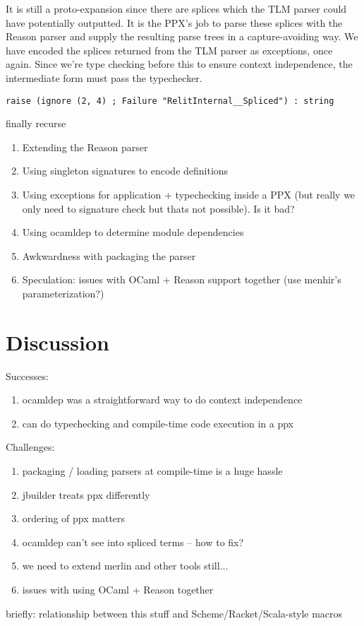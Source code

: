 \documentclass[acmsmall,review]{acmart}
\theoremstyle{slplain}
\numberwithin{thm}{section}
\begin{document}
It is still a proto-expansion since there are splices which the TLM parser could have potentially outputted. It is the PPX's job to parse these splices with the Reason parser and supply the resulting parse trees in a capture-avoiding way.  We have encoded the splices returned from the TLM parser as exceptions, once again. Since we're type checking 
before this to ensure context independence, the intermediate form must pass the typechecker.

\begin{lstlisting}
raise (ignore (2, 4) ; Failure "RelitInternal__Spliced") : string
\end{lstlisting}

finally recurse

\begin{enumerate}
  \item Extending the Reason parser
  \item Using singleton signatures to encode definitions
  \item Using exceptions for application + typechecking inside a PPX (but really we only need to signature check but thats not possible). Is it bad?
  \item Using ocamldep to determine module dependencies
  \item Awkwardness with packaging the parser
  \item Speculation: issues with OCaml + Reason support together (use menhir's parameterization?)
\end{enumerate}
\section{Discussion}
Successes:
\begin{enumerate}
  \item ocamldep was a straightforward way to do context independence
  \item can do typechecking and compile-time code execution in a ppx
\end{enumerate}

Challenges:
\begin{enumerate}
  \item packaging / loading parsers at compile-time is a huge hassle
  \item jbuilder treats ppx differently
  \item ordering of ppx matters
  \item ocamldep can't see into spliced terms -- how to fix?
  \item we need to extend merlin and other tools still...
  \item issues with using OCaml + Reason together
\end{enumerate}

briefly: relationship between this stuff and Scheme/Racket/Scala-style macros



% 
\end{document}
